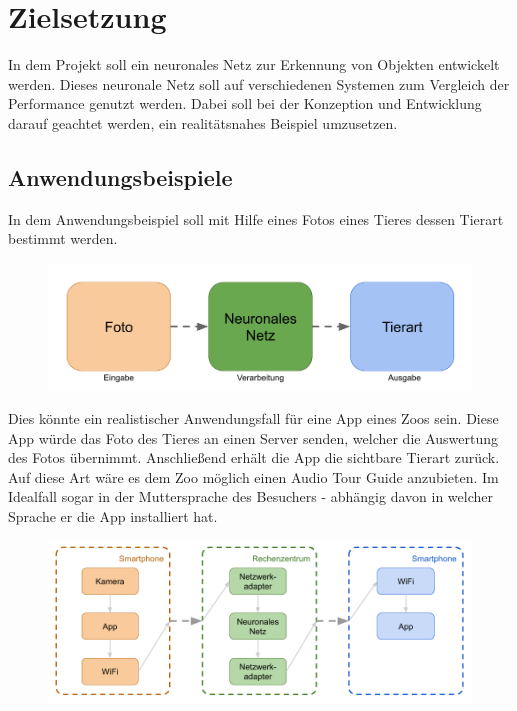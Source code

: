 

\chapter{Zielsetzung}

In dem Projekt soll ein neuronales Netz zur Erkennung von Objekten entwickelt werden. Dieses neuronale Netz soll auf verschiedenen Systemen zum Vergleich der Performance genutzt werden. Dabei soll bei der Konzeption und Entwicklung darauf geachtet werden, ein realitätsnahes Beispiel umzusetzen.



\section{Anwendungsbeispiele}

In dem Anwendungsbeispiel soll mit Hilfe eines Fotos eines Tieres dessen Tierart bestimmt werden. 

\begin{figure}[htbp]
	\centering
		\includegraphics[width=1.00\textwidth]{BilderPDF/zielsetzung/Prinzip.png}
	\label{fig:Prinzip}
\end{figure}

Dies könnte ein realistischer Anwendungsfall für eine App eines Zoos sein. Diese App würde das Foto des Tieres an einen Server senden, welcher die Auswertung des Fotos übernimmt. Anschließend erhält die App die sichtbare Tierart zurück. Auf diese Art wäre es dem Zoo  möglich einen Audio Tour Guide anzubieten. Im Idealfall sogar in der Muttersprache des Besuchers - abhängig davon in welcher Sprache er die App installiert hat. 

\begin{figure}[htbp]
	\centering
		\includegraphics[width=1.00\textwidth]{BilderPDF/zielsetzung/App.png}
	\label{fig:App}
\end{figure}

